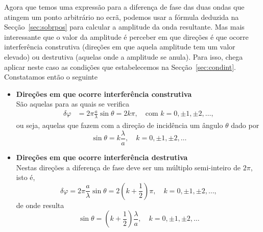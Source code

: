 Agora que temos uma expressão para a diferença de fase das duas ondas que
atingem um ponto arbitrário no ecrã, podemos usar a fórmula deduzida na
Secção~\ref{sec:sobrpos} para calcular a amplitude da onda resultante. Mas
mais interessante que o valor da amplitude é perceber em que direções é que
ocorre interferência construtiva (direções em que aquela amplitude tem um valor
elevado) ou destrutiva (aquelas onde a amplitude se anula). Para isso, chega
aplicar neste caso as condições que estabelecemos na Secção~\ref{sec:condint}.
Constatamos então o seguinte
\begin{itemize}
\item
    \textbf{Direções em que ocorre interferência construtiva}\\
    São aquelas para as quais se verifica
    \begin{align*}
    \delta\varphi &= 2\pi\frac{a}{\lambda}\sin\theta=
                    2k\pi,\quad\text{com }k=0,\pm1,\pm2,\ldots,
    \end{align*}
    ou seja, aquelas que fazem com a direção de incidência um ângulo $\theta$
    dado por
    \begin{equation*}
        \sin\theta=k\frac\lambda a,\quad k=0,\pm1,\pm2,\ldots
    \end{equation*}
\item
    \textbf{Direções em que ocorre interferência destrutiva}\\
    Nestas direções a diferença de fase deve ser um múltiplo semi-inteiro de
    $2\pi$, isto é,
    \begin{equation*}
        \delta\varphi=2\pi\frac{a}{\lambda}\sin\theta=2\left(k+\frac12\right)
        \pi,\quad k=0,\pm1,\pm2,\ldots,
    \end{equation*}
    de onde resulta
    \begin{equation*}
        \sin\theta=\left(k+\frac12\right)\frac\lambda a,\quad
        k=0,\pm1,\pm2,\ldots
    \end{equation*}
\end{itemize}

\pagebreak

